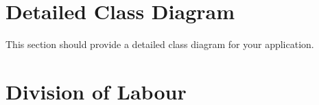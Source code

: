\documentclass[]{article}
\numberwithin{figure}{section}
\begin{document}
\section{Detailed Class Diagram}
\label{sec:detailed_class_diagram}
This section should provide a detailed class diagram for your application.

\appendix
\section{Division of Labour}
\label{sec:division_of_labour}

\end{document}

